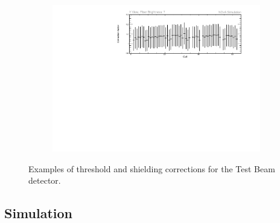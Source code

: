 \begin{figure}[hbtp]
\begin{subfigure}[t]{\textwidth}
\includegraphics[width=\textwidth]{Plots/TBCalibration/ThresholdCorrectionExample_cyview_fb7_P4DataBasedSim.pdf}
\end{subfigure}
\caption{Examples of threshold and shielding corrections for the Test Beam detector.}
\label{fig:TBThresholdCorrections}
\end{figure}

\subsection{Simulation}\label{sec:SimulationResults}



